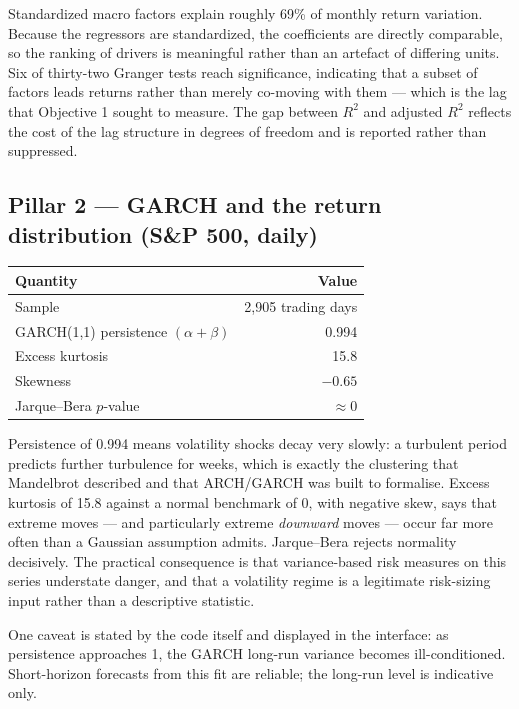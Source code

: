 \documentclass[11pt,a4paper]{article}
\begin{document}
Standardized macro factors explain roughly 69\% of monthly return variation. Because the
regressors are standardized, the coefficients are directly comparable, so the ranking of
drivers is meaningful rather than an artefact of differing units. Six of thirty-two Granger
tests reach significance, indicating that a subset of factors leads returns rather than
merely co-moving with them --- which is the lag that Objective 1 sought to measure. The gap
between $R^2$ and adjusted $R^2$ reflects the cost of the lag structure in degrees of
freedom and is reported rather than suppressed.

\subsection{Pillar 2 --- GARCH and the return distribution (S\&P 500, daily)}

\begin{center}
\begin{tabular}{lr}
\toprule
\textbf{Quantity} & \textbf{Value} \\
\midrule
Sample & 2{,}905 trading days \\
GARCH(1,1) persistence $(\alpha+\beta)$ & 0.994 \\
Excess kurtosis & 15.8 \\
Skewness & $-0.65$ \\
Jarque--Bera $p$-value & $\approx 0$ \\
\bottomrule
\end{tabular}
\end{center}

Persistence of 0.994 means volatility shocks decay very slowly: a turbulent period predicts
further turbulence for weeks, which is exactly the clustering that Mandelbrot described and
that ARCH/GARCH was built to formalise. Excess kurtosis of 15.8 against a normal benchmark
of 0, with negative skew, says that extreme moves --- and particularly extreme
\emph{downward} moves --- occur far more often than a Gaussian assumption admits.
Jarque--Bera rejects normality decisively. The practical consequence is that
variance-based risk measures on this series understate danger, and that a volatility regime
is a legitimate risk-sizing input rather than a descriptive statistic.

One caveat is stated by the code itself and displayed in the interface: as persistence
approaches 1, the GARCH long-run variance becomes ill-conditioned. Short-horizon forecasts
from this fit are reliable; the long-run level is indicative only.
\end{document}
